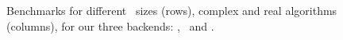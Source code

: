 \begin{figure}
    \caption{Benchmarks for different \dft\ sizes (rows), complex and real
    algorithms (columns), for our three backends: \bsl, \gsl\ and \fftw.}
    \label{fig:benchmarks}
\end{figure}


%
